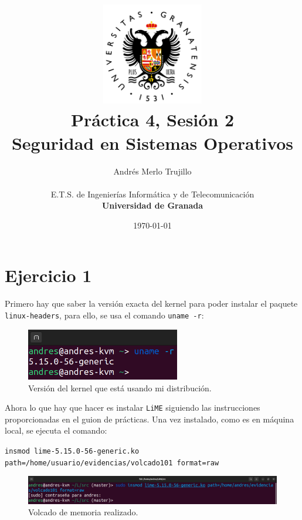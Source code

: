 \documentclass{article}
\title{
\includegraphics[width=1.75in]{imagenes/UGR-Logo.png} \\
\vspace*{1in}
\textbf{Práctica 4, Sesión 2} \\
Seguridad en Sistemas Operativos \\
\vspace*{0.5in}}
\author{Andrés Merlo Trujillo \\
\vspace*{0.5in} \\
E.T.S. de Ingenierías Informática y de Telecomunicación \\
\textbf{Universidad de Granada}} \date{\today}
\begin{document}
\begin{titlingpage}
\maketitle
\end{titlingpage}

\newpage

\tableofcontents

\newpage

\pagestyle{fancy}

\section{Ejercicio 1}

Primero hay que saber la versión exacta del kernel para poder instalar el paquete \verb|linux-headers|, para ello, se usa el comando \verb|uname -r|:

\begin{figure}[H]
    \centering
    \includegraphics[width=0.6\textwidth]{imagenes/Captura desde 2022-12-06 11-37-14.png}
    \caption{Versión del kernel que está usando mi distribución.}
\end{figure}

Ahora lo que hay que hacer es instalar \verb|LiME| siguiendo las instrucciones proporcionadas en el guion de prácticas. Una vez instalado, como es en máquina local, se ejecuta el comando:

\noindent
\verb|insmod lime-5.15.0-56-generic.ko path=/home/usuario/evidencias/volcado101 format=raw|

\begin{figure}[H]
    \centering
    \includegraphics[width=\textwidth]{imagenes/Captura desde 2022-12-06 11-41-59.png}
    \caption{Volcado de memoria realizado.}
\end{figure}
\end{document}
